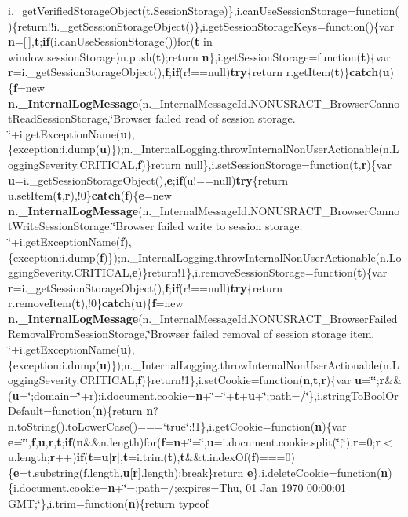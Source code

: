 i.\+\_\+get\+Verified\+Storage\+Object(t.\+Session\+Storage)\},i.\+can\+Use\+Session\+Storage=function()\{return!!i.\+\_\+get\+Session\+Storage\+Object()\},i.\+get\+Session\+Storage\+Keys=function()\{var {\bf n}=\mbox{[}$\,$\mbox{]},{\bf t};{\bf if}(i.\+can\+Use\+Session\+Storage())for({\bf t} in window.\+session\+Storage)n.\+push({\bf t});return {\bf n}\},i.\+get\+Session\+Storage=function({\bf t})\{var {\bf r}=i.\+\_\+get\+Session\+Storage\+Object(),{\bf f};{\bf if}(r!==null){\bf try}\{return r.\+get\+Item({\bf t})\}{\bf catch}({\bf u})\{{\bf f}=new {\bf n.\+\_\+\+Internal\+Log\+Message}(n.\+\_\+\+Internal\+Message\+Id.\+N\+O\+N\+U\+S\+R\+A\+C\+T\+\_\+\+Browser\+Cannot\+Read\+Session\+Storage,\char`\"{}Browser failed read of session storage. \char`\"{}+i.\+get\+Exception\+Name({\bf u}),\{exception\+:i.\+dump({\bf u})\});n.\+\_\+\+Internal\+Logging.\+throw\+Internal\+Non\+User\+Actionable(n.\+Logging\+Severity.\+C\+R\+I\+T\+I\+C\+AL,{\bf f})\}return null\},i.\+set\+Session\+Storage=function({\bf t},{\bf r})\{var {\bf u}=i.\+\_\+get\+Session\+Storage\+Object(),{\bf e};{\bf if}(u!==null){\bf try}\{return u.\+set\+Item({\bf t},{\bf r}),!0\}{\bf catch}({\bf f})\{{\bf e}=new {\bf n.\+\_\+\+Internal\+Log\+Message}(n.\+\_\+\+Internal\+Message\+Id.\+N\+O\+N\+U\+S\+R\+A\+C\+T\+\_\+\+Browser\+Cannot\+Write\+Session\+Storage,\char`\"{}Browser failed write to session storage. \char`\"{}+i.\+get\+Exception\+Name({\bf f}),\{exception\+:i.\+dump({\bf f})\});n.\+\_\+\+Internal\+Logging.\+throw\+Internal\+Non\+User\+Actionable(n.\+Logging\+Severity.\+C\+R\+I\+T\+I\+C\+AL,{\bf e})\}return!1\},i.\+remove\+Session\+Storage=function({\bf t})\{var {\bf r}=i.\+\_\+get\+Session\+Storage\+Object(),{\bf f};{\bf if}(r!==null){\bf try}\{return r.\+remove\+Item({\bf t}),!0\}{\bf catch}({\bf u})\{{\bf f}=new {\bf n.\+\_\+\+Internal\+Log\+Message}(n.\+\_\+\+Internal\+Message\+Id.\+N\+O\+N\+U\+S\+R\+A\+C\+T\+\_\+\+Browser\+Failed\+Removal\+From\+Session\+Storage,\char`\"{}Browser failed removal of session storage item. \char`\"{}+i.\+get\+Exception\+Name({\bf u}),\{exception\+:i.\+dump({\bf u})\});n.\+\_\+\+Internal\+Logging.\+throw\+Internal\+Non\+User\+Actionable(n.\+Logging\+Severity.\+C\+R\+I\+T\+I\+C\+AL,{\bf f})\}return!1\},i.\+set\+Cookie=function({\bf n},{\bf t},{\bf r})\{var {\bf u}=\char`\"{}\char`\"{};{\bf r}\&\&({\bf u}=\char`\"{};domain=\char`\"{}+r);i.\+document.\+cookie={\bf n}+\char`\"{}=\char`\"{}+{\bf t}+{\bf u}+\char`\"{};path=/\char`\"{}\},i.\+string\+To\+Bool\+Or\+Default=function({\bf n})\{return {\bf n}?n.\+to\+String().to\+Lower\+Case()===\char`\"{}true\char`\"{}\+:!1\},i.\+get\+Cookie=function({\bf n})\{var {\bf e}=\char`\"{}\char`\"{},{\bf f},{\bf u},{\bf r},{\bf t};{\bf if}({\bf n}\&\&n.\+length)for({\bf f}={\bf n}+\char`\"{}=\char`\"{},{\bf u}=i.\+document.\+cookie.\+split(\char`\"{};\char`\"{}),{\bf r}=0;{\bf r}$<$u.\+length;{\bf r}++){\bf if}({\bf t}={\bf u}\mbox{[}{\bf r}\mbox{]},{\bf t}=i.\+trim({\bf t}),{\bf t}\&\&t.\+index\+Of({\bf f})===0)\{{\bf e}=t.\+substring(f.\+length,{\bf u}\mbox{[}{\bf r}\mbox{]}.length);break\}return {\bf e}\},i.\+delete\+Cookie=function({\bf n})\{i.\+document.\+cookie={\bf n}+\char`\"{}=;path=/;expires=Thu, 01 Jan 1970 00\+:00\+:01 G\+MT;\char`\"{}\},i.\+trim=function({\bf n})\{return typeof 